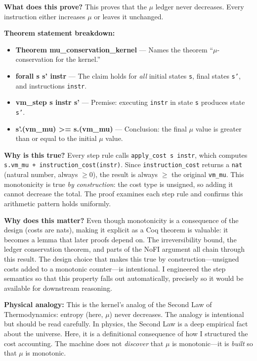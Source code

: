 \textbf{What does this prove?} This proves that the $\mu$ ledger never decreases. Every instruction either increases $\mu$ or leaves it unchanged.

\textbf{Theorem statement breakdown:}
\begin{itemize}
    \item \textbf{Theorem mu\_conservation\_kernel} — Names the theorem ``$\mu$-conservation for the kernel.''
    \item \textbf{forall s s' instr} — The claim holds for \textit{all} initial states \texttt{s}, final states \texttt{s'}, and instructions \texttt{instr}.
    \item \textbf{vm\_step s instr s'} — Premise: executing \texttt{instr} in state \texttt{s} produces state \texttt{s'}.
    \item \textbf{s'.(vm\_mu) >= s.(vm\_mu)} — Conclusion: the final $\mu$ value is greater than or equal to the initial $\mu$ value.
\end{itemize}

\textbf{Why is this true?} Every step rule calls \texttt{apply\_cost s instr}, which computes \texttt{s.vm\_mu + instruction\_cost(instr)}. Since \texttt{instruction\_cost} returns a \texttt{nat} (natural number, always $\geq 0$), the result is always $\geq$ the original \texttt{vm\_mu}. This monotonicity is true \textit{by construction}: the cost type is unsigned, so adding it cannot decrease the total. The proof examines each step rule and confirms this arithmetic pattern holds uniformly.

\textbf{Why does this matter?} Even though monotonicity is a consequence of the design (costs are nats), making it explicit as a Coq theorem is valuable: it becomes a lemma that later proofs depend on. The irreversibility bound, the ledger conservation theorem, and parts of the NoFI argument all chain through this result. The design choice that makes this true by construction---unsigned costs added to a monotonic counter---is intentional. I engineered the step semantics so that this property falls out automatically, precisely so it would be available for downstream reasoning.

\textbf{Physical analogy:} This is the kernel's analog of the Second Law of Thermodynamics: entropy (here, $\mu$) never decreases. The analogy is intentional but should be read carefully. In physics, the Second Law is a deep empirical fact about the universe. Here, it is a definitional consequence of how I structured the cost accounting. The machine does not \textit{discover} that $\mu$ is monotonic---it is \textit{built} so that $\mu$ is monotonic.


